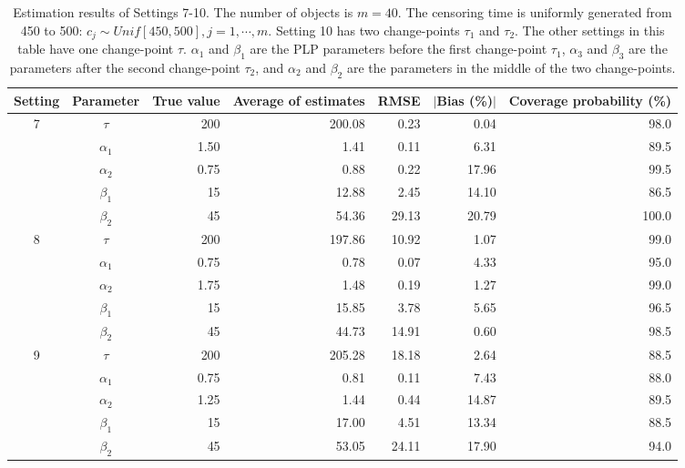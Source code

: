 \documentclass[12pt]{article}
\numberwithin{equation}{section}
\begin{document}
\begin{table}[htbp]
	\centering
	\caption{Estimation results of Settings 7-10. The number of objects is $m=40$.
		The censoring time is uniformly generated from 450 to 500: $c_j\sim Unif[450,500], j = 1, \cdots, m$. Setting 10 has two change-points $\tau_1$ and $\tau_2$. The other settings in this table have one change-point $\tau$. $\alpha_1$ and $\beta_1$ are the PLP parameters before the first change-point $\tau_1$, $\alpha_3$ and $\beta_3$ are the parameters after the second change-point  $\tau_2$, and $\alpha_2$ and $\beta_2$ are the parameters in the middle of the two change-points.}
	\begin{tabular}{ccrrrrr}
		\hline
		\multicolumn{1}{c}{Setting} & \multicolumn{1}{c}{Parameter} & \multicolumn{1}{p{2em}}{True value} & \multicolumn{1}{p{5.1em}}{Average of  estimates} & \multicolumn{1}{c}{RMSE} & \multicolumn{1}{c}{$|$Bias (\%)$|$} & \multicolumn{1}{p{4.8em}}{Coverage probability (\%) } \\       \hline
\multirow{5}[2]{*}{7} 
		
		& $\tau$		      & 200   & 200.08 & 0.23  & 0.04  & 98.0 \\			
		& $\alpha_1$		               & 1.50   & 1.41  & 0.11  & 6.31  & 89.5 \\			
		& $\alpha_2$		           & 0.75  & 0.88  & 0.22  & 17.96 & 99.5 \\			
		& $\beta_1$		          & 15    & 12.88 & 2.45  & 14.10  & 86.5 \\			
		& $\beta_2$		          & 45    & 54.36 & 29.13 & 20.79 & 100.0 \\			
		
		\hline		
		
		\multirow{5}[2]{*}{8} 
		& $\tau$		     & 200   & 197.86 & 10.92 & 1.07  & 99.0 \\			
		& $\alpha_1$		                 & 0.75  & 0.78  & 0.07  & 4.33  & 95.0 \\			
		& $\alpha_2$		         & 1.75  & 1.48  & 0.19  & 1.27  & 99.0 \\			
		& $\beta_1$		         & 15    & 15.85 & 3.78  & 5.65  & 96.5 \\			
		& $\beta_2$		         & 45    & 44.73 & 14.91 & 0.60   & 98.5 \\			
\hline
		\multirow{5}[2]{*}{9} 				
		& $\tau$		    & 200   & 205.28 & 18.18 & 2.64  & 88.5 \\			
		& $\alpha_1$& 0.75  & 0.81  & 0.11  & 7.43  & 88.0 \\			
		& $\alpha_2$ & 1.25  & 1.44  & 0.44  & 14.87 & 89.5 \\			
		& $\beta_1$	 & 15    & 17.00    & 4.51  & 13.34 & 88.5 \\			
		& $\beta_2$	& 45    & 53.05 & 24.11 & 17.90  & 94.0 \\					
		\hline


\end{tabular}
\end{table}
\end{document}
